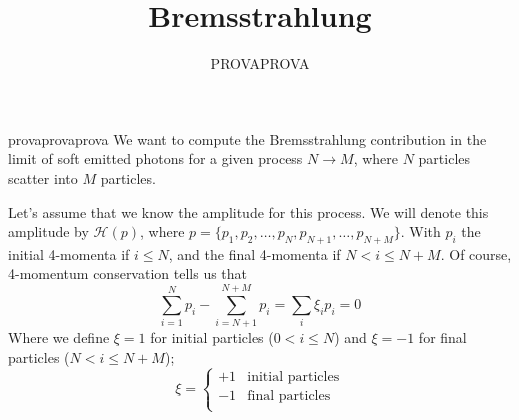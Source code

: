 \documentclass{article}
\title{Bremsstrahlung}
\author{PROVAPROVA}
\begin{document}
\maketitle

provaprovaprova
We want to compute the Bremsstrahlung contribution
in the limit of soft emitted photons for a given process $N \to M$,
where $N$ particles scatter into $M$ particles.

\begin{center}
\end{center}

Let's assume that we know the amplitude for this process.
We will denote this amplitude by $\mathcal{H}(p)$,
where $p = \{p_1, p_2, \ldots, p_N, p_{N+1}, \ldots, p_{N+M}\}$.
With $p_i$ the initial 4-momenta if $i\leq N$, and the final 4-momenta if $N<i\leq N+M$.
Of course, 4-momentum conservation tells us that
\begin{equation*}
	\sum_{i=1}^{N}p_i - \sum_{i=N+1}^{N+M} p_i
	= \sum_i \xi_i p_i
	= 0
\end{equation*}
Where we define $\xi=1$ for initial particles ($0<i\leq N$)
and $\xi=-1$ for final particles ($N<i\leq N+M$);
\begin{equation*}
    \xi
    = \begin{cases}
        +1 & \text{initial particles}\\
        -1 & \text{final particles}\\
    \end{cases}
\end{equation*}
\end{document}
